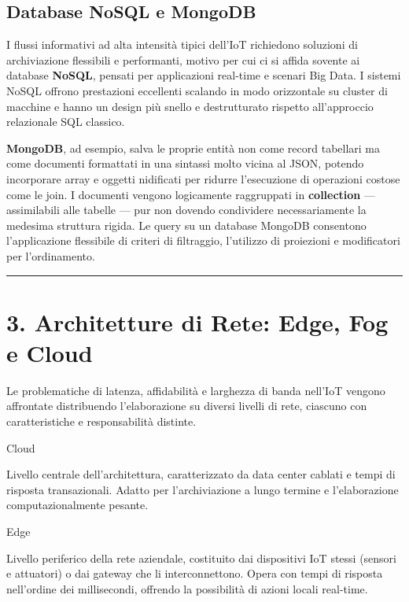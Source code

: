 \documentclass[
  italian,
  openany]{book}
\begin{document}
\subsection{Database NoSQL e MongoDB}\label{database-nosql-e-mongodb}

I flussi informativi ad alta intensità tipici dell'IoT richiedono
soluzioni di archiviazione flessibili e performanti, motivo per cui ci
si affida sovente ai database \textbf{NoSQL}, pensati per applicazioni
real-time e scenari Big Data. I sistemi NoSQL offrono prestazioni
eccellenti scalando in modo orizzontale su cluster di macchine e hanno
un design più snello e destrutturato rispetto all'approccio relazionale
SQL classico.

\textbf{MongoDB}, ad esempio, salva le proprie entità non come record
tabellari ma come documenti formattati in una sintassi molto vicina al
JSON, potendo incorporare array e oggetti nidificati per ridurre
l'esecuzione di operazioni costose come le join. I documenti vengono
logicamente raggruppati in \textbf{collection} --- assimilabili alle
tabelle --- pur non dovendo condividere necessariamente la medesima
struttura rigida. Le query su un database MongoDB consentono
l'applicazione flessibile di criteri di filtraggio, l'utilizzo di
proiezioni e modificatori per l'ordinamento.

\begin{center}\rule{0.5\linewidth}{0.5pt}\end{center}

\section{3. Architetture di Rete: Edge, Fog e
Cloud}\label{architetture-di-rete-edge-fog-e-cloud}

Le problematiche di latenza, affidabilità e larghezza di banda nell'IoT
vengono affrontate distribuendo l'elaborazione su diversi livelli di
rete, ciascuno con caratteristiche e responsabilità distinte.

\begin{calloutdefinition}{Cloud}

Livello centrale dell'architettura, caratterizzato da data center
cablati e tempi di risposta transazionali. Adatto per l'archiviazione a
lungo termine e l'elaborazione computazionalmente pesante.

\end{calloutdefinition}

\begin{calloutdefinition}{Edge}

Livello periferico della rete aziendale, costituito dai dispositivi IoT
stessi (sensori e attuatori) o dai gateway che li interconnettono. Opera
con tempi di risposta nell'ordine dei millisecondi, offrendo la
possibilità di azioni locali real-time.

\end{calloutdefinition}
\end{document}
